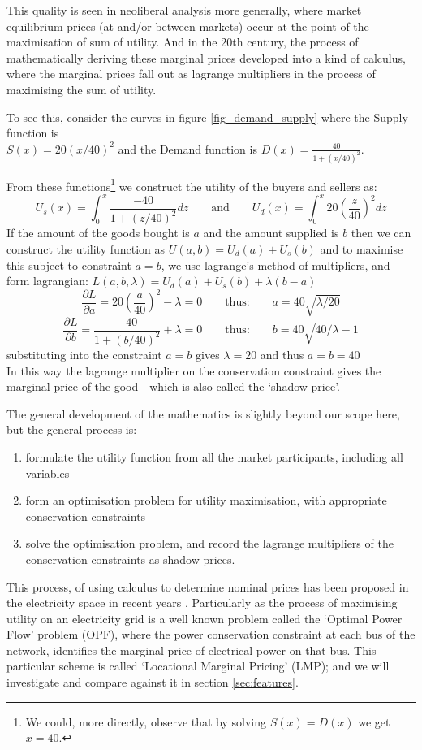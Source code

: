 This quality is seen in neoliberal analysis more generally, where market equilibrium prices (at and/or between markets) occur at the point of the maximisation of sum of utility.
And in the 20th century, the process of mathematically deriving these marginal prices developed into a kind of calculus, where the marginal prices fall out as lagrange multipliers in the process of maximising the sum of utility.

To see this, consider the curves in figure \ref{fig_demand_supply} where the Supply function is\\ $S(x) = 20(x/40)^2$ and the Demand function is $D(x) = \frac{40}{1+(x/40)^2}$.


From these functions\footnote{We could, more directly, observe that by solving $S(x)=D(x)$ we get $x=40$.} we construct the utility of the buyers and sellers as:
$$U_s(x) = \int_0^x\frac{-40}{1+(z/40)^2}dz \quad\quad\text{and}\quad\quad U_d(x) = \int_0^x20\left(\frac{z}{40}\right)^2dz$$
If the amount of the goods bought is $a$ and the amount supplied is $b$ then we can construct the utility function as $U(a,b) = U_d(a) + U_s(b)$
and to maximise this subject to constraint $a=b$, we use lagrange's method of multipliers, and form lagrangian:
$L(a,b,\lambda) = U_d(a) + U_s(b) + \lambda(b-a)$
$$\frac{\partial L}{\partial a} = 20\left(\frac{a}{40}\right)^2 - \lambda = 0 \quad\quad\text{thus:}\quad\quad a = 40\sqrt{\lambda/20}$$
$$\frac{\partial L}{\partial b} = \frac{-40}{1+(b/40)^2} + \lambda = 0 \quad\quad\text{thus:}\quad\quad b = 40\sqrt{40/\lambda - 1}$$
substituting into the constraint $a=b$ gives $\lambda=20$ and thus $a=b=40$\\
In this way the lagrange multiplier on the conservation constraint gives the marginal price of the good - which is also called the `shadow price'.

The general development of the mathematics is slightly beyond our scope here, but the general process is:
\begin{enumerate}
\item formulate the utility function from all the market participants, including all variables
\item form an optimisation problem for utility maximisation, with appropriate conservation constraints
\item solve the optimisation problem, and record the lagrange multipliers of the conservation constraints as shadow prices.
\end{enumerate}
This process, of using calculus to determine nominal prices has been proposed in the electricity space in recent years \cite{lmp1, lmp2, lmp4, game3}.
Particularly as the process of maximising utility on an electricity grid is a well known problem called the `Optimal Power Flow' problem (OPF), where the power conservation constraint at each bus of the network, identifies the marginal price of electrical power on that bus.
This particular scheme is called `Locational Marginal Pricing' (LMP); and we will investigate and compare against it in section \ref{sec:features}.

